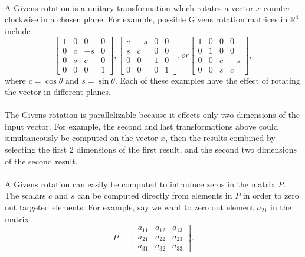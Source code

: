 \documentclass{article}
\begin{document}
\paragraph{}
A Givens rotation is a unitary transformation which rotates a vector $x$ counter-clockwise in a chosen plane. For example, possible Givens rotation matrices in $\mathbb{R}^4$ include
\begin{equation}
\begin{bmatrix}
1 & 0 & 0 & 0\\
0 & c & -s & 0\\
0 & s & c & 0\\
0 & 0 & 0 & 1
\end{bmatrix},
\begin{bmatrix}
c & -s & 0 & 0\\
s & c & 0 & 0\\
0 & 0 & 1 & 0\\
0 & 0 & 0 & 1
\end{bmatrix}, or
\begin{bmatrix}
1 & 0 & 0 & 0\\
0 & 1 & 0 & 0\\
0 & 0 & c & -s\\
0 & 0 & s & c
\end{bmatrix},
\end{equation}
where $c = \cos{\theta}$ and $s = \sin{\theta}$. Each of these examples have the effect of rotating the vector in different planes.
\paragraph{}
The Givens rotation is parallelizable because it effects only two dimensions of the input vector. For example, the second and last transformations above could 
simultaneously be computed on the vector $x$, then the results combined by selecting the first 2 
dimensions of the first result, and the second two dimensions of the second result.

\paragraph{}
A Givens rotation can easily be computed to introduce zeros in the matrix $P$. The scalars $c$ and $s$ 
can be computed directly from elements in $P$ in order to zero out targeted elements. For 
example, say we want to zero out element $a_{21}$ in the matrix
\begin{equation}
P = 
\begin{bmatrix}
a_{11} & a_{12} & a_{13}\\
a_{21} & a_{22} & a_{23}\\
a_{31} & a_{32} & a_{33}
\end{bmatrix}.
\end{equation}
\end{document}
